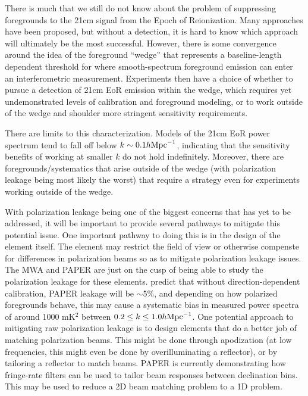 \documentclass[11pt]{article}
\begin{document}
There is much that we still do not know about the problem of suppressing
foregrounds to the 21cm signal from the Epoch of Reionization.  Many approaches
have been proposed, but without a detection, it is hard to know which approach
will ultimately be the most successful.  However, there is some convergence
around the idea of the foreground ``wedge'' that represents a baseline-length
dependent threshold for where smooth-spectrum foreground emission can enter an
interferometric measurement.  Experiments then have a choice of whether to
pursue a detection of 21cm EoR emission within the wedge, which requires yet
undemonstrated levels of calibration and foreground modeling, or to work
outside of the wedge and shoulder more stringent sensitivity requirements.

There are limits to this characterization.  Models of the 21cm EoR power
spectrum tend to fall off below $k\sim 0.1h {\rm Mpc}^{-1}$, indicating that
the sensitivity benefits of working at smaller $k$ do not hold indefinitely.
Moreover, there are foregrounds/systematics that arise outside of the wedge
(with polarization leakage being most likely the worst) that require a strategy
even for experiments working outside of the wedge.

With polarization leakage being one of the biggest concerns
that has yet to be addressed, it will be important to provide several pathways to
mitigate this potential issue.  One important pathway to doing this is in the design of the
element itself.  
The element
may restrict the field of view or otherwise compenste for differences in polarization beams
so as to mitigate polarization leakage issues.
The MWA and PAPER are just on the cusp of being able to study the polarization
leakage for these elements.  \citet{moore_et_al2013} predict that without direction-dependent
calibration, PAPER leakage will be $\sim$5\%, and depending on how polarized foregrounds
behave, this may cause a systematic bias in measured power spectra of around 1000 mK$^2$ between
$0.2\le k\le 1.0h {\rm Mpc}^{-1}$.  
One potential approach to mitigating raw polarization leakage is to design elements that do a better
job of matching polarization beams.  This might be done through apodization (at low frequencies, this
might even be done by overilluminating a reflector), or by tailoring a reflector to match beams.
PAPER is currently demonstrating how fringe-rate filters can be used to tailor beam responses between
declination bins.  This may be used to reduce a 2D beam matching problem to a 1D problem.
\end{document}
